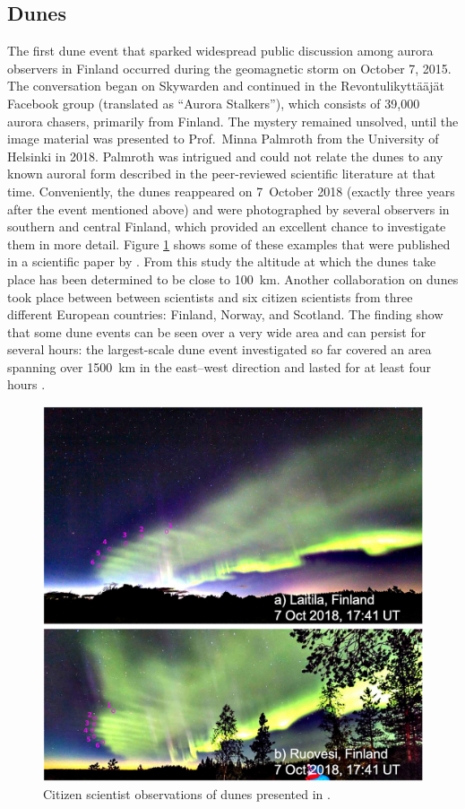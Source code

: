 \documentclass{article}
\renewcommand{\cite}[1]{\parencite{#1}}
\newcommand{\contributed}[1]{%
    \par\noindent
    \begingroup
    \setlength{\leftskip}{1em}%
    \itshape
    Contributors: #1
    \par
    \endgroup
    \vspace{0.5em}
}
\begin{document}
\subsection{Dunes}\label{Dunes}  
The first dune event that sparked widespread public discussion among aurora observers in Finland occurred during the geomagnetic storm on October 7, 2015. The conversation began on Skywarden and continued in the Revontulikyttääjät Facebook group (translated as ``Aurora Stalkers''), which consists of 39,000 aurora chasers, primarily from Finland. The mystery remained unsolved, until the image material was presented to Prof.~Minna Palmroth from the University of Helsinki in 2018. Palmroth was intrigued and could not relate the dunes to any known auroral form described in the peer-reviewed scientific literature at that time. Conveniently, the dunes reappeared on 7~October 2018 (exactly three years after the event mentioned above) and were photographed by several observers in southern and central Finland, which provided an excellent chance to investigate them in more detail. Figure \ref{DuneExample} shows some of these examples that were published in a scientific paper by \textcite{Palmroth2020}. From this study the altitude at which the dunes take place has been determined to be close to 100~km. Another collaboration on dunes took place between between scientists and six citizen scientists from three different European countries: Finland, Norway, and Scotland. The finding \cite{Grandin2021} show that some dune events can be seen over a very wide area and can persist for several hours: the largest-scale dune event investigated so far covered an area spanning over 1500~km in the east--west direction and lasted for at least four hours \cite{Grandin2021}.
\begin{figure}[h!]
  \includegraphics[width=0.9\linewidth]{Fig7_dunes.jpg}
  \caption{Citizen scientist observations of dunes presented in \textcite{Palmroth2020}.}
  \label{DuneExample}
\end{figure}
\end{document}
